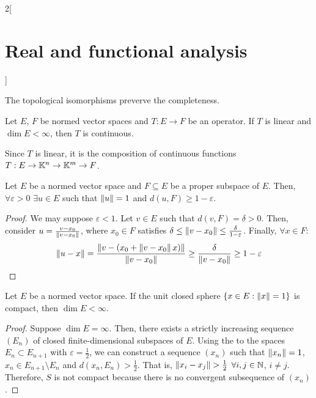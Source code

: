 \documentclass[../../../main_math.tex]{subfiles}
\begin{document}
\begin{multicols}{2}[\section{Real and functional analysis}]
\begin{corollary}
  \end{corollary}
  \begin{sproof}
    The topological isomorphisms preverve the completeness.
  \end{sproof}
  \begin{corollary}
    Let $E$, $F$ be normed vector spaces and $T:E\rightarrow F$ be an operator. If $T$ is linear and $\dim E<\infty$, then $T$ is continuous.
  \end{corollary}
  \begin{sproof}
    Since $T$ is linear, it is the composition of continuous functions $T:E\rightarrow \mathbb{K}^n\rightarrow\mathbb{K}^m\rightarrow F$.
  \end{sproof}
  \begin{lemma}\label{RFA:almostorthogonality}
    Let $E$ be a normed vector space and $F\subseteq E$ be a proper subspace of $E$. Then, $\forall \varepsilon>0$ $\exists u\in E$ such that $\left\|u\right\|=1$ and $d(u,F)\geq 1-\varepsilon$.
  \end{lemma}
  \begin{proof}
    We may suppose $\varepsilon<1$. Let $v\in E$ such that $d(v,F)=\delta>0$. Then, consider $u=\frac{v-x_0}{\left\|v-x_0\right\|}$, where $x_0\in F$ satisfies $\delta\leq \left\|v-x_0\right\|\leq \frac{\delta}{1-\varepsilon}$. Finally, $\forall x\in F$:
    $$\left\|u-x\right\|=\frac{\left\|v-(x_0+\left\|v-x_0\right\|x)\right\|}{\left\|v-x_0\right\|}\geq \frac{\delta}{\left\|v-x_0\right\|}\geq 1-\varepsilon$$
  \end{proof}
  \begin{theorem}
    Let $E$ be a normed vector space. If the unit closed sphere $\{x\in E:\left\|x\right\|=1\}$ is compact, then $\dim E<\infty$.
  \end{theorem}
  \begin{proof}
    Suppose $\dim E=\infty$. Then, there exists a strictly increasing sequence $(E_n)$ of closed finite-dimensional subspaces of $E$. Using the  to the spaces $E_n\subset E_{n+1}$ with $\varepsilon =\frac{1}{2}$, we can construct a sequence $(x_n)$ such that $\left\|x_n\right\|=1$, $x_n\in E_{n+1}\setminus E_n$ and $d(x_n, E_n)>\frac{1}{2}$. That is, $\norm{x_i-x_j}>\frac{1}{2}$ $\forall i, j\in\mathbb{N}$, $i\ne j$. Therefore, $S$ is not compact because there is no convergent subsequence of $(x_n)$.
  \end{proof}

\end{multicols}
\end{document}
